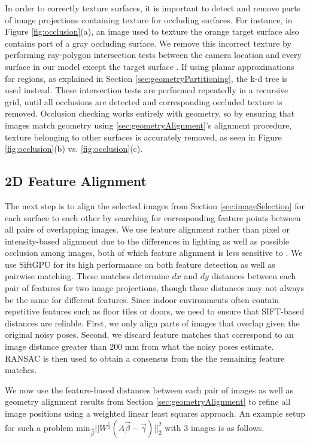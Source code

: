 \documentclass[]{spie}  %
\begin{document}
In order to correctly texture surfaces, it is important to detect and
remove parts of image projections containing texture for occluding
surfaces. For instance, in Figure \ref{fig:occlusion}(a), an image
used to texture the orange target surface also contains part of a gray
occluding surface. We remove this incorrect texture by performing
ray-polygon intersection tests between the camera location and every
surface in our model except the target surface
\cite{rayintersection}. If using planar approximations for regions, as
explained in Section \ref{sec:geometryPartitioning}, the k-d tree is
used instead. These intersection tests are performed repeatedly in a
recursive grid, until all occlusions are detected and corresponding
occluded texture is removed. Occlusion checking works entirely with
geometry, so by ensuring that images match geometry using
\ref{sec:geometryAlignment}'s alignment procedure, texture belonging
to other surfaces is accurately removed, as seen in Figure
\ref{fig:occlusion}(b) vs. \ref{fig:occlusion}(c).

\subsection{2D Feature Alignment}
\label{sec:robustSIFTFeatureMatching}
The next step is to align the selected images from Section
\ref{sec:imageSelection} for each surface to each other by searching
for corresponding feature points between all pairs of overlapping
images. We use feature alignment rather than pixel or intensity-based
alignment due to the differences in lighting as well as possible
occlusion among images, both of which feature alignment is less
sensitive to \cite{lowe1999object, mikolajczyk2005performance,
  szeliski2006image}. We use SiftGPU \cite{siftgpu} for its high
performance on both feature detection as well as pairwise
matching. These matches determine $dx$ and $dy$ distances between each
pair of features for two image projections, though these distances may
not always be the same for different features. Since indoor
environments often contain repetitive features such as floor tiles or
doors, we need to ensure that SIFT-based distances are
reliable. First, we only align parts of images that overlap given the
original noisy poses. Second, we discard feature matches that
correspond to an image distance greater than 200 mm from what the
noisy poses estimate. RANSAC \cite{fischler1981random} is then used to
obtain a consensus from the the remaining feature matches.

We now use the feature-based distances between each pair of images as
well as geometry alignment results from Section
\ref{sec:geometryAlignment} to refine all image positions using a
weighted linear least squares approach. An example setup for such a problem $\textrm{min}_{\vec{\beta}}
||W^\frac{1}{2}(A \vec{\beta} - \vec{\gamma})||_2^2 $ with 3 images is
as follows.
\end{document}

